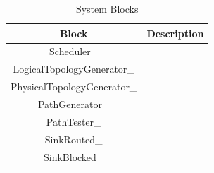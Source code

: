 \begin{table}[H]
	\centering
	\begin{tabular}{| c | c |}
		\hline
		\textbf{Block}             & \textbf{Description}\\ \hline
		Scheduler\_                &                     \\ \hline
		LogicalTopologyGenerator\_ &                     \\ \hline
		PhysicalTopologyGenerator\_&                     \\ \hline
		PathGenerator\_            &                     \\ \hline
		PathTester\_               &                     \\ \hline
		SinkRouted\_               &                     \\ \hline
		SinkBlocked\_              &                     \\ \hline
	\end{tabular}
	\caption{System Blocks}
	\label{system_blocks}
\end{table}


